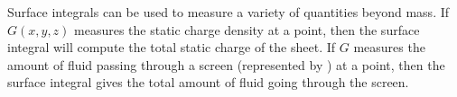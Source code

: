 Surface integrals can be used to measure a variety of quantities beyond mass. If $G(x,y,z)$ measures the static charge density at a point, then the surface integral will compute the total static charge of the sheet. If $G$ measures the amount of fluid passing through a screen (represented by \surfaceS) at a point, then the surface integral gives the total amount of fluid going through the screen.



